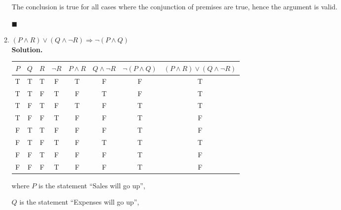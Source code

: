 \documentclass{report}
\newcommand{\sol}{\vspace{1em}\\\textbf{Solution.}\vspace{0.5em}}
\newcommand{\qed}{\ \\\strut\hfill$\blacksquare$\vspace{1em}}
\begin{document}
\begin{enumerate}[leftmargin=*]
\begin{enumerate}
                    The conclusion is true for all cases where the conjunction of premises are
                    true, hence the argument is valid.\qed

              \item $(P \wedge R) \vee (Q \wedge \neg R)
                        \Rightarrow \neg(P \wedge Q)$
                    \sol{}
                    \begin{center}
                        \begin{tabular}{cccccccc}
                            $P$ & $Q$ & $R$ & $\neg R$ & $P \wedge R$ & $Q \wedge \neg R$ & $\neg(P \wedge Q)$ & $(P \wedge R) \vee (Q \wedge \neg R)$ \\
                            \hline
                            T   & T   & T   & F        & T            & F                 & F                  & T                                     \\
                            T   & T   & F   & T        & F            & T                 & F                  & T                                     \\
                            T   & F   & T   & F        & T            & F                 & T                  & T                                     \\
                            T   & F   & F   & T        & F            & F                 & T                  & F                                     \\
                            F   & T   & T   & F        & F            & F                 & T                  & F                                     \\
                            F   & T   & F   & T        & F            & T                 & T                  & T                                     \\
                            F   & F   & T   & F        & F            & F                 & T                  & F                                     \\
                            F   & F   & F   & T        & F            & F                 & T                  & F
                        \end{tabular}
                    \end{center}
                    where $P$ is the statement ``Sales will go up'',

                    $Q$ is the statement ``Expenses will go up'',


\end{enumerate}
\end{enumerate}
\end{document}
